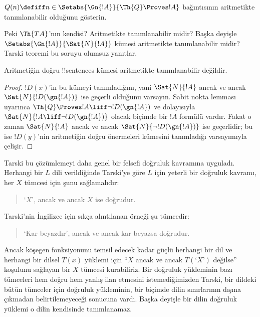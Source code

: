 \documentclass[../../../include/open-logic-section]{subfiles}
\begin{document}
\begin{prob}
$Q(n) \defiff n \in \Setabs{\Gn{!A}}{\Th{Q} \Proves !A}$ bağıntısının
aritmetikte tanımlanabilir olduğunu gösterin.
\end{prob}

Peki $\Th{TA}$'nın kendisi? Aritmetikte tanımlanabilir midir? Başka deyişle
$\Setabs{\Gn{!A}}{\Sat{N}{!A}}$ kümesi aritmetikte tanımlanabilir midir?
Tarski teoremi bu soruyu olumsuz yanıtlar.

\begin{thm}
Aritmetiğin doğru !!{sentence}s kümesi aritmetikte tanımlanabilir değildir.
\end{thm}

\begin{proof} 
$!D(x)$'in bu kümeyi tanımladığını, yani $\Sat{N}{!A}$ ancak ve ancak
$\Sat{N}{!D(\gn{!A})}$ ise geçerli olduğunu varsayın. Sabit nokta lemması
uyarınca $\Th{Q} \Proves !A \liff \lnot !D(\gn{!A})$ ve dolayısıyla
$\Sat{N}{!A \liff \lnot !D(\gn{!A})}$ olacak biçimde bir $!A$ formülü vardır.
Fakat o zaman $\Sat{N}{!A}$ ancak ve ancak
$\Sat{N}{\lnot !D(\gn{!A})}$ ise geçerlidir; bu ise $!D(y)$'nin aritmetiğin
doğru önermeleri kümesini tanımladığı varsayımıyla çelişir.
\end{proof}

Tarski bu çözümlemeyi daha genel bir felsefi doğruluk kavramına uyguladı.
Herhangi bir $L$ dili verildiğinde Tarski'ye göre $L$ için yeterli bir doğruluk kavramı, her
$X$ tümcesi için şunu sağlamalıdır:
\begin{quote}
`$X$', ancak ve ancak $X$ ise doğrudur.
\end{quote}
Tarski'nin İngilizce için sıkça alıntılanan örneği şu tümcedir:
\begin{quote}
`Kar beyazdır', ancak ve ancak kar beyazsa doğrudur.
\end{quote}
Ancak köşegen fonksiyonunu temsil edecek kadar güçlü herhangi bir dil ve
herhangi bir dilsel $T(x)$ yüklemi için ``$X$ ancak ve ancak
$T(\text{`$X$'})$ değilse'' koşulunu sağlayan bir $X$ tümcesi kurabiliriz.
Bir doğruluk yükleminin bazı tümceleri hem doğru hem yanlış ilan etmesini
istemediğimizden Tarski, bir dildeki bütün tümceler için doğruluk yükleminin,
bir biçimde dilin sınırlarının dışına çıkmadan belirtilemeyeceği sonucuna
vardı. Başka deyişle bir dilin doğruluk yüklemi o dilin kendisinde
tanımlanamaz.
\end{document}
